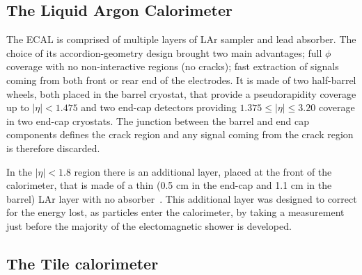 			\subsection*{The Liquid Argon Calorimeter}

 				The \ac{ECAL} is comprised of multiple layers of \ac{LAr} sampler and lead absorber. The choice of its accordion-geometry design brought two main advantages; full $\phi$ coverage with no non-interactive regions (no cracks); fast extraction of signals coming from both front or rear end of the electrodes. It is made of two half-barrel wheels, both placed in the barrel cryostat, that provide a pseudorapidity coverage up to $\left | \eta\right | < 1.475$ and two end-cap detectors providing $1.375 \leq \left|\eta\right| \leq 3.20$ coverage in two end-cap cryostats. The junction between the barrel and end cap components defines the crack region and any signal coming from the crack region is therefore discarded. 

 				In the $\left | \eta\right | < 1.8$ region there is an additional layer, placed at the front of the calorimeter, that is made of a thin (0.5 cm in the end-cap and 1.1 cm in the barrel) \ac{LAr} layer with no absorber~\cite{ATLASLAR}. This additional layer was designed to correct for the energy lost, as particles enter the calorimeter, by taking a measurement just before the majority of the electomagnetic shower is developed. 



			\subsection*{The Tile calorimeter}

